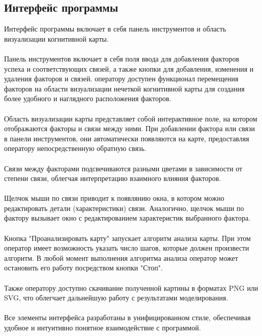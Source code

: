 \documentclass{article}
\begin{document}
    \subsection {Интерфейс программы}
    Интерфейс программы включает в себя панель инструментов и область визуализации когнитивной карты.\\
    ~\\
    Панель инструментов включает в себя поля ввода для добавления факторов успеха и соответствующих связей, а также кнопки для добавления, изменения и удаления факторов и связей. оператору доступен функционал перемещения факторов на области визуализации нечеткой когнитивной карты для создания более удобного и наглядного расположения факторов.\\
    ~\\
    Область визуализации карты представляет собой интерактивное поле, на котором отображаются факторы и связи между ними. При добавлении фактора или связи в панели инструментов, они автоматически появляются на карте, предоставляя оператору непосредственную обратную связь.\\
    ~\\
    Связи между факторами подсвечиваются разными цветами в зависимости от степени связи, облегчая интерпретацию взаимного влияния факторов.\\
    ~\\
    Щелчок мыши по связи приводит к появлянию окна, в котором можно редактировать детали (характеристики) связи. Аналогично, щелчок мыши по фактору вызывает окно с редактированием характеристик выбранного фактора.\\
    ~\\
    Кнопка "{}Проанализировать карту"{} запускает алгоритм анализа карты. При этом оператор имеет возможность указать число шагов, которые должен произвести алгоритм. В любой момент выполнения алгоритма анализа оператор может остановить его работу посредством кнопки "{}Стоп"{}.\\
    ~\\
    Также оператору доступно скачивание полученной картины в форматах PNG или SVG, что облегчает дальнейшую работу с результатами моделирования.\\
    ~\\
    Все элементы интерфейса разработаны в унифицированном стиле, обеспечивая удобное и интуитивно понятное взаимодействие с программой.\\
\end{document}
